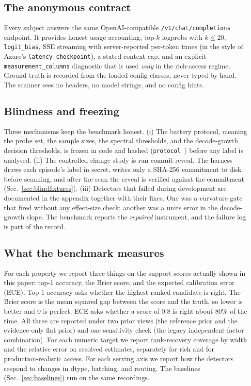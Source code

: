 \subsection{The anonymous contract}
Every subject answers the same OpenAI-compatible \texttt{/v1/chat/completions} endpoint.
It provides honest usage accounting, top-$k$ logprobs with $k\le20$, \texttt{logit\_bias},
SSE streaming with server-reported per-token times (in the style of Azure's
\texttt{latency\_checkpoint}), a stated context cap, and an explicit
\texttt{measurement\_columns} diagnostic that is used \emph{only} in the rich-access
regime.  Ground truth is recorded from the loaded config classes, never typed by hand.
The scanner sees no headers, no model strings, and no config hints.

\subsection{Blindness and freezing}
Three mechanisms keep the benchmark honest.  (i) The battery protocol, meaning the probe
set, the sample sizes, the spectral thresholds, and the decode-growth decision
thresholds, is frozen in code and hashed (\texttt{protocol \ProtocolHash}) before any
label is analysed.  (ii) The controlled-change study is run commit-reveal.  The harness
draws each episode's label in secret, writes only a SHA-256 commitment to disk before
scanning, and after the scan the reveal is verified against the commitment
(Sec.~\ref{sec:blindfixtures}).  (iii) Detectors that failed during development are
documented in the appendix together with their fixes.  One was a curvature gate that
fired without any effect-size check; another was a units error in the decode-growth
slope.  The benchmark reports the \emph{repaired} instrument, and the failure log is
part of the record.

\subsection{What the benchmark measures}
For each property we report three things on the support scores actually shown in this
paper: top-1 accuracy, the Brier score, and the expected calibration error (ECE).  Top-1
accuracy asks whether the highest-ranked candidate is right.  The Brier score is the
mean squared gap between the score and the truth, so lower is better and 0 is perfect.
ECE asks whether a score of 0.8 is right about 80\% of the time.  All three are reported
under two prior views (the reference prior and the evidence-only flat prior) and one
sensitivity check (the legacy independent-factor combination).  For each numeric target
we report rank-recovery coverage by width and the relative error on resolved estimates,
separately for rich and for production-realistic access.  For each serving axis we
report how the detectors respond to changes in dtype, batching, and routing.  The
baselines (Sec.~\ref{sec:baselines}) run on the same recordings.
